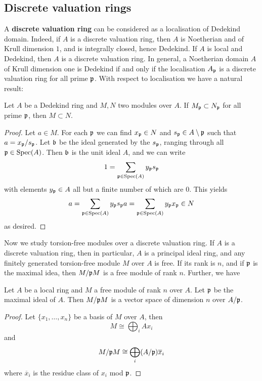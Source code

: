		\subsection{Discrete valuation rings}
			A \textbf{discrete valuation ring} can be considered as a localisation of Dedekind domain. Indeed, if $A$ is a discrete valuation ring, then $A$ is Noetherian and of Krull dimension $1$, and is integrally closed, hence Dedekind. If $A$ is local and Dedekind, then $A$ is a discrete valuation ring. In general, a Noetherian domain $A$ of Krull dimension one is Dedekind if and only if the localisation $A_\mathfrak{p}$ is a discrete valuation ring for all prime $\mathfrak{p}$. With respect to localisation we have a natural result:
			\begin{theorem}
				Let $A$ be a Dedekind ring and $M,N$ two modules over $A$. If $M_\mathfrak{p} \subset N_\mathfrak{p}$ for all prime $\mathfrak{p}$, then $M \subset N$.
			\end{theorem}
			\begin{proof}
				Let $a \in M$. For each $\mathfrak{p}$ we can find $x_\mathfrak{p} \in N$ and $s_\mathfrak{p} \in A \setminus \mathfrak{p}$ such that $a = x_\mathfrak{p}/s_\mathfrak{p}$. Let $\mathfrak{b}$ be the ideal generated by the $s_\mathfrak{p}$, ranging through all $\mathfrak{p} \in \operatorname{Spec}(A)$. Then $\mathfrak{b}$ is the unit ideal $A$, and we can write
				\[
					1 = \sum_{\mathfrak{p} \in \operatorname{Spec}(A)} y_\mathfrak{p}s_\mathfrak{p}
				\]
				with elements $y_\mathfrak{p} \in A$ all but a finite number of which are $0$. This yields
				\[
					a = \sum_{\mathfrak{p} \in \operatorname{Spec}(A)} y_\mathfrak{p}s_\mathfrak{p}a = \sum_{\mathfrak{p} \in \operatorname{Spec}(A)} y_\mathfrak{p}x_\mathfrak{p} \in N
				\]
				as desired.
			\end{proof}
		
			Now we study torsion-free modules over a discrete valuation ring. If $A$ is a discrete valuation ring, then in particular, $A$ is a principal ideal ring, and any finitely generated torsion-free module $M$ over $A$ is free. If its rank is $n$, and if $\mathfrak{p}$ is the maximal idea, then $M/\mathfrak{p}M$ is a free module of rank $n$. Further, we have
			\begin{theorem}
				Let $A$ be a local ring and $M$ a free module of rank $n$ over $A$. Let $\mathfrak{p}$ be the maximal ideal of $A$. Then $M/\mathfrak{p}M$ is a vector space of dimension $n$ over $A/\mathfrak{p}$.
			\end{theorem}
			\begin{proof}
				Let $\{x_1,\dots,x_n\}$ be a basis of $M$ over $A$, then
				\[
					M \cong \bigoplus_{i}Ax_i
				\]
				and
				\[
					M/\mathfrak{p}M \cong \bigoplus_{i}(A/\mathfrak{p})\overline{x}_i
				\]
				where $\overline{x}_i$ is the residue class of $x_i$ mod $\mathfrak{p}$.
			\end{proof}
